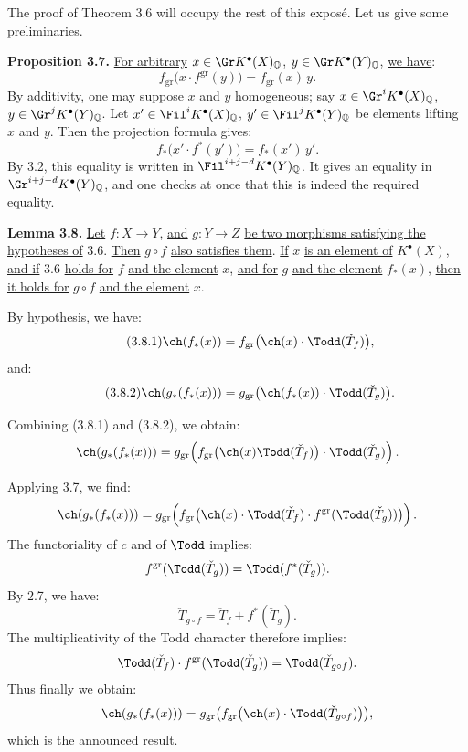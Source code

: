 %
The proof of
Theorem 3.6 will occupy the rest of this exposé. Let us give some preliminaries.

\textbf{Proposition 3.7.} \uline{For arbitrary} $x\in \Gr K^{\bullet}(X)_{\mathbb Q}$, $y\in \Gr K^{\bullet}(Y)_{\mathbb Q}$, \uline{we have}:
\[
 f_{\mathrm{gr}}\bigl(x\cdot f^{\mathrm{gr}}(y)\bigr)
 =
 f_{\mathrm{gr}}(x)\,y .
\]
By additivity, one may suppose \(x\) and \(y\) homogeneous; say $x\in \Gr^iK^{\bullet}(X)_{\mathbb Q}$, $y\in \Gr^jK^{\bullet}(Y)_{\mathbb Q}$.
Let $x'\in \Fil^iK^{\bullet}(X)_{\mathbb Q}$, $y'\in \Fil^jK^{\bullet}(Y)_{\mathbb Q}$ be elements lifting \(x\) and \(y\). Then the projection formula gives:
\[
 f_*\bigl(x'\cdot f^*(y')\bigr)=f_*(x')\,y'.
\]
By 3.2, this equality is written in
\(\Fil^{i+j-d}K^{\bullet}(Y)_{\mathbb Q}\). It gives an equality in
\(\Gr^{i+j-d}K^{\bullet}(Y)_{\mathbb Q}\), and one checks at once that this is indeed the required equality.

\textbf{Lemma 3.8.} \uline{Let} \(f:X\to Y\), \uline{and} \(g:Y\to Z\) \uline{be two morphisms satisfying the hypotheses of} 3.6. \uline{Then} \(g\circ f\) \uline{also satisfies them}. \uline{If} \(x\) \uline{is an element of} \(K^{\bullet}(X)\), \uline{and if} 3.6 \uline{holds for} \(f\) \uline{and the element} \(x\), \uline{and for} \(g\) \uline{and the element} \(f_*(x)\), \uline{then it holds for} \(g\circ f\) \uline{and the element} \(x\).

By hypothesis, we have:
\begin{equation}\tag{3.8.1}
 \ch(f_*(x))=
 f_{\mathrm{gr}}\bigl(\ch(x)\cdot\Todd(\check T_f)\bigr),
\end{equation}
and:
\begin{equation}\tag{3.8.2}
 \ch(g_*(f_*(x)))=
 g_{\mathrm{gr}}\bigl(\ch(f_*(x))\cdot\Todd(\check T_g)\bigr).
\end{equation}

Combining (3.8.1) and (3.8.2), we obtain:
\[
\ch(g_*(f_*(x)))=
g_{\mathrm{gr}}\!\left(
 f_{\mathrm{gr}}\bigl(\ch(x)\Todd(\check T_f)\bigr)\cdot \Todd(\check T_g)
\right).
\]

%
Applying
3.7, we find:
\[
\ch(g_*(f_*(x)))=
g_{\mathrm{gr}}\!\left(
 f_{\mathrm{gr}}\bigl(\ch(x)\cdot\Todd(\check T_f)\cdot
 f^{\mathrm{gr}}(\Todd(\check T_g))\bigr)
\right).
\]
The functoriality of \(c\) and of \(\Todd\) implies:
\[
 f^{\mathrm{gr}}(\Todd(\check T_g))=\Todd(f^*(\check T_g)).
\]
By 2.7, we have:
\[
 \check T_{g\circ f}=\check T_f+f^*(\check T_g).
\]
The multiplicativity of the Todd character therefore implies:
\[
 \Todd(\check T_f)\cdot f^{\mathrm{gr}}(\Todd(\check T_g))
 =
 \Todd(\check T_{g\circ f}).
\]
Thus finally we obtain:
\[
 \ch(g_*(f_*(x)))=
 g_{\mathrm{gr}}\bigl(f_{\mathrm{gr}}\bigl(\ch(x)\cdot\Todd(\check T_{g\circ f})\bigr)\bigr),
\]
which is the announced result.

